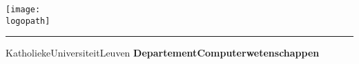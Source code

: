 \documentclass[a4paper, 12pt]{article}
\begin{document}

\begin{titlepage}
    \newpage
    \thispagestyle{empty}
    \frenchspacing
    \hspace{-0.2cm}
    \texttt{[image: \\logopath]}
    \hspace{0.2cm}
    \rule{0.5pt}{3.4cm}
    \hspace{0.2cm}
    \begin{minipage}[b]{8cm}
        \Large{Katholieke\newline Universiteit\newline Leuven}\smallskip\newline
        \large{}\smallskip\newline
        \textbf{Departement\newline Computerwetenschappen}\smallskip
    \end{minipage}
    \vspace*{3.2cm}\vfill
    \begin{center}
        \begin{minipage}[t]{\textwidth}
            \begin{center}
                \LARGE{\rm{\textbf{\uppercase{\titletext}}}}\\
                \Large{\rm{\subtitletext}}
            \end{center}
        \end{minipage}
    \end{center}
    \vfill
    \hfill{}
\end{titlepage}
\end{document}
